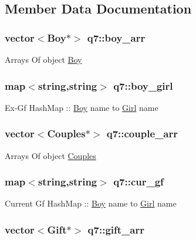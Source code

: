 \subsection{Member Data Documentation}
\hypertarget{classq7_aec35cf024f064050845895f828d51298}{
\subsubsection[{boy\-\_\-arr}]{\setlength{\rightskip}{0pt plus 5cm}vector$<${\bf Boy}$\ast$$>$ q7\-::boy\-\_\-arr}}\label{classq7_aec35cf024f064050845895f828d51298}
Arrays Of object \hyperlink{class_boy}{Boy} \hypertarget{classq7_a2232c64f17f45590eeffe4f276d0a36c}{
\subsubsection[{boy\-\_\-girl}]{\setlength{\rightskip}{0pt plus 5cm}map$<$string,string$>$ q7\-::boy\-\_\-girl}}\label{classq7_a2232c64f17f45590eeffe4f276d0a36c}
Ex-\/\-Gf Hash\-Map \-:\-: \hyperlink{class_boy}{Boy} name to \hyperlink{class_girl}{Girl} name \hypertarget{classq7_aab715b0d48ac69f2920401830edf6b71}{
\subsubsection[{couple\-\_\-arr}]{\setlength{\rightskip}{0pt plus 5cm}vector$<${\bf Couples}$\ast$$>$ q7\-::couple\-\_\-arr}}\label{classq7_aab715b0d48ac69f2920401830edf6b71}
Arrays Of object \hyperlink{class_couples}{Couples} \hypertarget{classq7_a4730e4b96cd44d58e4dc0c07dc632c71}{
\subsubsection[{cur\-\_\-gf}]{\setlength{\rightskip}{0pt plus 5cm}map$<$string,string$>$ q7\-::cur\-\_\-gf}}\label{classq7_a4730e4b96cd44d58e4dc0c07dc632c71}
Current Gf Hash\-Map \-:\-: \hyperlink{class_boy}{Boy} name to \hyperlink{class_girl}{Girl} name \hypertarget{classq7_a8370eca4c952b788a18e970431ecf014}{
\subsubsection[{gift\-\_\-arr}]{\setlength{\rightskip}{0pt plus 5cm}vector$<${\bf Gift}$\ast$$>$ q7\-::gift\-\_\-arr}}\label{classq7_a8370eca4c952b788a18e970431ecf014}
